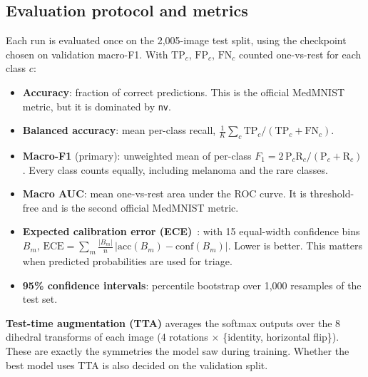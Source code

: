 \subsection{Evaluation protocol and metrics}
Each run is evaluated once on the 2{,}005-image test split, using the checkpoint chosen on validation
macro-F1. With $\mathrm{TP}_c$, $\mathrm{FP}_c$, $\mathrm{FN}_c$ counted one-vs-rest for each class $c$:
\begin{itemize}
  \item \textbf{Accuracy}: fraction of correct predictions. This is the official MedMNIST metric, but it is
        dominated by \texttt{nv}.
  \item \textbf{Balanced accuracy}: mean per-class recall,
        $\frac1K\sum_c \mathrm{TP}_c/(\mathrm{TP}_c+\mathrm{FN}_c)$.
  \item \textbf{Macro-F1} (primary): unweighted mean of per-class
        $F_1 = 2\,\mathrm{P}_c\mathrm{R}_c/(\mathrm{P}_c+\mathrm{R}_c)$. Every class counts equally, including
        melanoma and the rare classes.
  \item \textbf{Macro AUC}: mean one-vs-rest area under the ROC curve. It is threshold-free and is the second
        official MedMNIST metric.
  \item \textbf{Expected calibration error (ECE)}~\cite{guo2017}: with 15 equal-width confidence bins $B_m$,
        $\mathrm{ECE} = \sum_m \frac{|B_m|}{n}\,\big|\mathrm{acc}(B_m) - \mathrm{conf}(B_m)\big|$. Lower is better.
        This matters when predicted probabilities are used for triage.
  \item \textbf{95\% confidence intervals}: percentile bootstrap over 1{,}000 resamples of the test set.
\end{itemize}
\textbf{Test-time augmentation (TTA)} averages the softmax outputs over the 8 dihedral transforms of each
image (4 rotations $\times$ \{identity, horizontal flip\}). These are exactly the symmetries the model saw
during training. Whether the best model uses TTA is also decided on the validation split.
